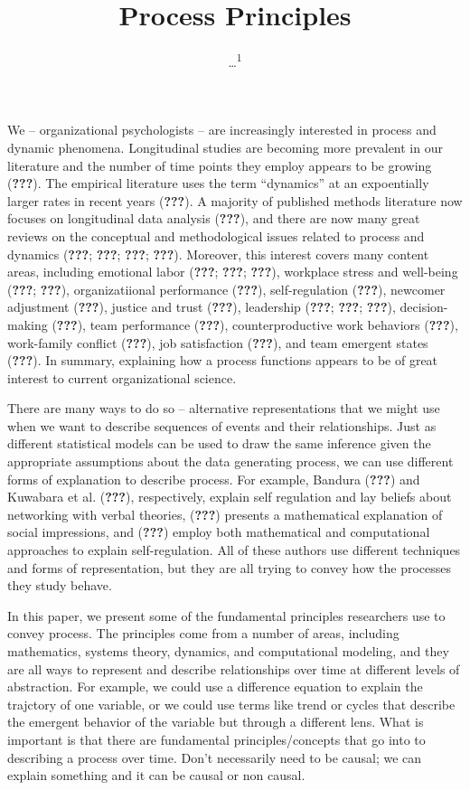 \documentclass[english,,man]{apa6}
\title{Process Principles}
\author{\ldots{}\textsuperscript{1}}
\date{}
\affiliation{
\vspace{0.5cm}
\textsuperscript{1} ...}
\theoremstyle{definition}
\theoremstyle{definition}
\theoremstyle{definition}
\theoremstyle{remark}
\begin{document}
\maketitle

We -- organizational psychologists -- are increasingly interested in
process and dynamic phenomena. Longitudinal studies are becoming more
prevalent in our literature and the number of time points they employ
appears to be growing ({\textbf{???}}). The empirical literature uses
the term \enquote{dynamics} at an expoentially larger rates in recent
years ({\textbf{???}}). A majority of published methods literature now
focuses on longitudinal data analysis ({\textbf{???}}), and there are
now many great reviews on the conceptual and methodological issues
related to process and dynamics ({\textbf{???}}; {\textbf{???}};
{\textbf{???}}; {\textbf{???}}). Moreover, this interest covers many
content areas, including emotional labor ({\textbf{???}};
{\textbf{???}}; {\textbf{???}}), workplace stress and well-being
({\textbf{???}}; {\textbf{???}}), organizatiional performance
({\textbf{???}}), self-regulation ({\textbf{???}}), newcomer adjustment
({\textbf{???}}), justice and trust ({\textbf{???}}), leadership
({\textbf{???}}; {\textbf{???}}; {\textbf{???}}), decision-making
({\textbf{???}}), team performance ({\textbf{???}}), counterproductive
work behaviors ({\textbf{???}}), work-family conflict ({\textbf{???}}),
job satisfaction ({\textbf{???}}), and team emergent states
({\textbf{???}}). In summary, explaining how a process functions appears
to be of great interest to current organizational science.

There are many ways to do so -- alternative representations that we
might use when we want to describe sequences of events and their
relationships. Just as different statistical models can be used to draw
the same inference given the appropriate assumptions about the data
generating process, we can use different forms of explanation to
describe process. For example, Bandura ({\textbf{???}}) and Kuwabara et
al. ({\textbf{???}}), respectively, explain self regulation and lay
beliefs about networking with verbal theories, ({\textbf{???}}) presents
a mathematical explanation of social impressions, and ({\textbf{???}})
employ both mathematical and computational approaches to explain
self-regulation. All of these authors use different techniques and forms
of representation, but they are all trying to convey how the processes
they study behave.

In this paper, we present some of the fundamental principles researchers
use to convey process. The principles come from a number of areas,
including mathematics, systems theory, dynamics, and computational
modeling, and they are all ways to represent and describe relationships
over time at different levels of abstraction. For example, we could use
a difference equation to explain the trajctory of one variable, or we
could use terms like trend or cycles that describe the emergent behavior
of the variable but through a different lens. What is important is that
there are fundamental principles/concepts that go into to describing a
process over time. Don't necessarily need to be causal; we can explain
something and it can be causal or non causal.
\end{document}
